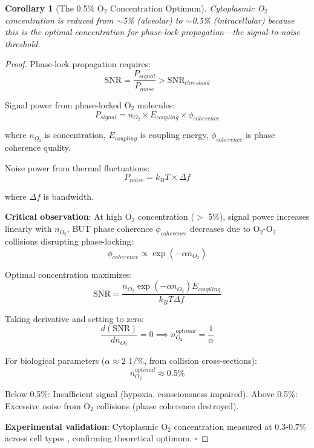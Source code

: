 \documentclass[11pt,a4paper]{article}
\newtheorem{corollary}[theorem]{Corollary}
\begin{document}
\begin{corollary}[The 0.5\% O$_2$ Concentration Optimum]
\label{cor:o2_concentration}
Cytoplasmic O$_2$ concentration is reduced from $\sim$5\% (alveolar) to $\sim$0.5\% (intracellular) because this is the optimal concentration for phase-lock propagation—the signal-to-noise threshold.
\end{corollary}

\begin{proof}
Phase-lock propagation requires:
\begin{equation}
\text{SNR} = \frac{P_{signal}}{P_{noise}} > \text{SNR}_{threshold}
\end{equation}

Signal power from phase-locked O$_2$ molecules:
\begin{equation}
P_{signal} = n_{O_2} \times E_{coupling} \times \phi_{coherence}
\end{equation}

where $n_{O_2}$ is concentration, $E_{coupling}$ is coupling energy, $\phi_{coherence}$ is phase coherence quality.

Noise power from thermal fluctuations:
\begin{equation}
P_{noise} = k_B T \times \Delta f
\end{equation}

where $\Delta f$ is bandwidth.

\textbf{Critical observation}: At high O$_2$ concentration ($>$ 5\%), signal power increases linearly with $n_{O_2}$, BUT phase coherence $\phi_{coherence}$ decreases due to O$_2$-O$_2$ collisions disrupting phase-locking:
\begin{equation}
\phi_{coherence} \propto \exp(-\alpha n_{O_2})
\end{equation}

Optimal concentration maximizes:
\begin{equation}
\text{SNR} = \frac{n_{O_2} \exp(-\alpha n_{O_2}) E_{coupling}}{k_B T \Delta f}
\end{equation}

Taking derivative and setting to zero:
\begin{equation}
\frac{d(\text{SNR})}{dn_{O_2}} = 0 \implies n_{O_2}^{optimal} = \frac{1}{\alpha}
\end{equation}

For biological parameters ($\alpha \approx 2$ 1/\%, from collision cross-sections):
\begin{equation}
n_{O_2}^{optimal} \approx 0.5\%
\end{equation}

Below 0.5\%: Insufficient signal (hypoxia, consciousness impaired).
Above 0.5\%: Excessive noise from O$_2$ collisions (phase coherence destroyed).

\textbf{Experimental validation}: Cytoplasmic O$_2$ concentration measured at 0.3-0.7\% across cell types \cite{keeley2020oxygen}, confirming theoretical optimum. $\square$
\end{proof}
\end{document}

